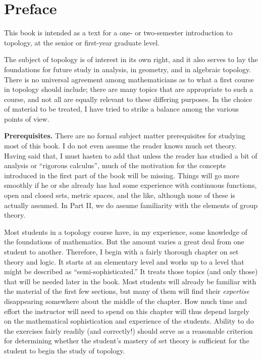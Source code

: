 \chapter{Preface}

\large
\setlength{\parskip}{0.3\baselineskip} %
\setlength{\parindent}{2em} %
\vspace{6.5cm}
This book is intended as a text for a one- or two-semester introduction to topology, 
at the senior or first-year graduate level.

The subject of topology is of interest in its own right, and it also serves to lay 
the foundations for future study in analysis, in geometry, and in algebraic topology. 
There is no universal agreement among mathematicians as to what a first course in 
topology should include; there are many topics that are appropriate to such a course, 
and not all are equally relevant to these differing purposes. In the choice of material 
to be treated, I have tried to strike a balance among the various points of view.

\noindent\textbf{Prerequisites. }There are no formal subject matter prerequisites 
for studying most of this book. I do not even assume the reader knows much set theory. 
Having said that, I must hasten to add that unless the reader has studied a bit of 
analysis or ``rigorous calculus'', much of the motivation for the concepts introduced 
in the first part of the book will be missing. Things will go more smoothly if he or 
she already has had some experience with continuous functions, open and closed sets, 
metric spaces, and the like, although none of these is actually assumed. In Part II, 
we do assume familiarity with the elements of group theory.

Most students in a topology course have, in my experience, some knowledge of the 
foundations of mathematics. But the amount varies a great deal from one student to 
another. Therefore, I begin with a fairly thorough chapter on set theory and logic. 
It starts at an elementary level and works up to a level that might be described as 
``semi-sophisticated.'' It treats those topics (and only those) that will be needed 
later in the book. Most students will already be familiar with the material of the 
first few sections, but many of them will find their \textit{expertise} disappearing 
somewhere about the middle of the chapter. How much time and effort the instructor 
will need to spend on this chapter will thus depend largely on the mathematical 
sophistication and experience of the students. Ability to do the exercises fairly 
readily (and correctly!) should serve as a reasonable criterion for determining 
whether the student's mastery of set theory is sufficient for the student to begin 
the study of topology.

